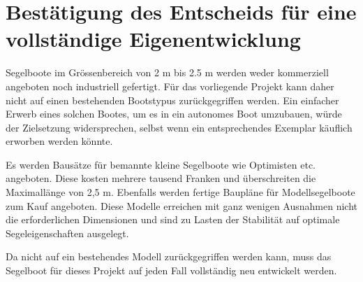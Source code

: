 \section{Bestätigung des Entscheids für eine vollständige Eigenentwicklung}
Segelboote im Grössenbereich von 2 m bis 2.5 m werden weder kommerziell angeboten noch industriell gefertigt. Für das vorliegende Projekt kann daher nicht auf einen bestehenden Bootstypus zurückgegriffen werden. Ein einfacher Erwerb eines solchen Bootes, um es in ein autonomes Boot umzubauen, würde der Zielsetzung widersprechen, selbst wenn ein entsprechendes Exemplar käuflich erworben werden könnte.

 Es werden Bausätze für bemannte kleine Segelboote wie Optimisten etc. angeboten. Diese kosten mehrere tausend Franken und überschreiten die Maximallänge von 2,5 m. Ebenfalls werden fertige Baupläne für Modellsegelboote zum Kauf angeboten. Diese Modelle erreichen mit ganz wenigen Ausnahmen nicht die erforderlichen Dimensionen und sind zu Lasten der Stabilität auf optimale Segeleigenschaften ausgelegt. 

Da nicht auf ein bestehendes Modell zurückgegriffen werden kann, muss das Segelboot für dieses Projekt auf jeden Fall vollständig neu entwickelt werden. 



